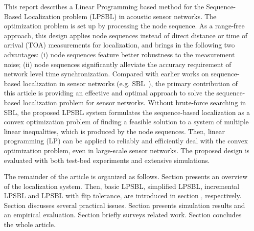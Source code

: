 This report describes a Linear Programming based method
for the Sequence-Based Localization problem (LPSBL)  in acoustic sensor networks.
The optimization problem is set up by processing the node sequence. 
As a range-free approach, this design applies node sequences instead of direct distance
or time of arrival (TOA) measurements for localization, and brings in the following two advantages: (i) node sequences feature better
robustness to the measurement noise; (ii) node sequences significantly alleviate the accuracy requirement of network level time synchronization. 
Compared with earlier works on sequence-based localization in sensor
networks (e.g. SBL~\cite{yedavalli2008sequence}), the primary contribution
of this article is providing an effective and optimal approach
to solve the sequence-based localization problem for sensor networks. 
Without brute-force searching in SBL, the proposed LPSBL system formulates the
sequence-based localization as a convex optimization problem
of finding a feasible solution to a system of multiple linear
inequalities, which is produced by the node sequences.
Then, linear programming (LP) can be applied to reliably and efficiently deal with the convex optimization problem,
even in large-scale sensor networks. 
The proposed design is evaluated with both test-bed experiments and extensive simulations. 


The remainder of the article is organized as follows. 
Section \uppercase\expandafter{} presents an overview of the  localization system.
Then, basic LPSBL, simplified LPSBL, incremental LPSBL and LPSBL with flip tolerance, are introduced in section \uppercase\expandafter{}, respectively.
Section \uppercase\expandafter{} discusses several practical issues.
Section \uppercase\expandafter{} presents simulation results and an empirical evaluation. Section \uppercase\expandafter{} briefly surveys related work.
Section \uppercase\expandafter{} concludes the whole article.



